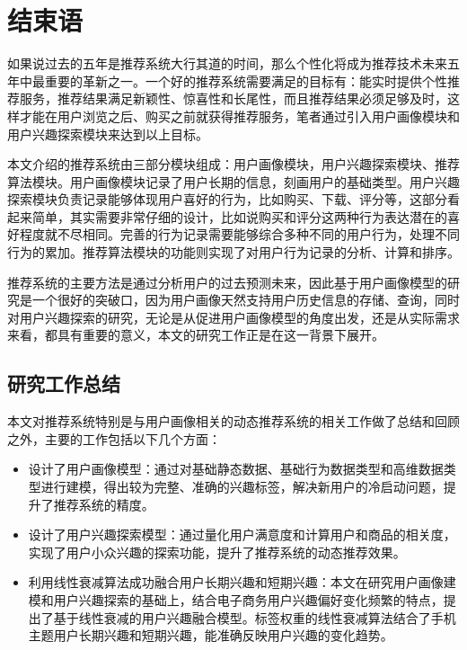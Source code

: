 
\chapter{结束语}
  如果说过去的五年是推荐系统大行其道的时间，那么个性化将成为推荐技术未来五年中最重要的革新之一。一个好的推荐系统需要满足的目标有：能实时提供个性推荐服务，推荐结果满足新颖性、惊喜性和长尾性，而且推荐结果必须足够及时，这样才能在用户浏览之后、购买之前就获得推荐服务，笔者通过引入用户画像模块和用户兴趣探索模块来达到以上目标。

  本文介绍的推荐系统由三部分模块组成：用户画像模块，用户兴趣探索模块、推荐算法模块。用户画像模块记录了用户长期的信息，刻画用户的基础类型。用户兴趣探索模块负责记录能够体现用户喜好的行为，比如购买、下载、评分等，这部分看起来简单，其实需要非常仔细的设计，比如说购买和评分这两种行为表达潜在的喜好程度就不尽相同。完善的行为记录需要能够综合多种不同的用户行为，处理不同行为的累加。推荐算法模块的功能则实现了对用户行为记录的分析、计算和排序。

  推荐系统的主要方法是通过分析用户的过去预测未来，因此基于用户画像模型的研究是一个很好的突破口，因为用户画像天然支持用户历史信息的存储、查询，同时对用户兴趣探索的研究，无论是从促进用户画像模型的角度出发，还是从实际需求来看，都具有重要的意义，本文的研究工作正是在这一背景下展开。

  \section{研究工作总结}
    本文对推荐系统特别是与用户画像相关的动态推荐系统的相关工作做了总结和回顾之外，主要的工作包括以下几个方面：
    \begin{itemize}
      \item 设计了用户画像模型：通过对基础静态数据、基础行为数据类型和高维数据类型进行建模，得出较为完整、准确的兴趣标签，解决新用户的冷启动问题，提升了推荐系统的精度。
      \item 设计了用户兴趣探索模型：通过量化用户满意度和计算用户和商品的相关度，实现了用户小众兴趣的探索功能，提升了推荐系统的动态推荐效果。
      \item 利用线性衰减算法成功融合用户长期兴趣和短期兴趣：本文在研究用户画像建模和用户兴趣探索的基础上，结合电子商务用户兴趣偏好变化频繁的特点，提出了基于线性衰减的用户兴趣融合模型。标签权重的线性衰减算法结合了手机主题用户长期兴趣和短期兴趣，能准确反映用户兴趣的变化趋势。
    \end{itemize}

